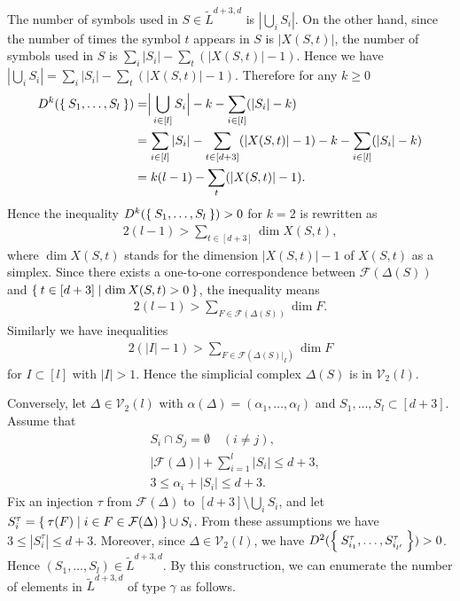 \documentclass{wstmp}
\begin{document}
The number of symbols used in $S\in \tilde L^{d+3,d}$
is ${\left|{\bigcup_i S_i}\right|}$.
On the other hand,
since 
the number of times the symbol $t$ appears in $S$ is ${\left|{X(S,t)}\right|}$,
the number of symbols used in $S$ is
$\sum_i {\left|{S_i}\right|} - \sum_t({\left|{X(S,t)}\right|}-1)$.
Hence we have 
${\left|{\bigcup_i S_i}\right|}=\sum_i {\left|{S_i}\right|} - \sum_t({\left|{X(S,t)}\right|}-1)$.
Therefore for any $k\ge 0$
\begin{align*}
D^{k}(\Set{S_1,\ldots,S_l})
&=\Bigr|\bigcup_{i \in [l]} S_i \Bigr| -k - \sum_{i\in [l]} ({\left|{S_i}\right|}-k)\\
&=\sum_{i\in [l]} {\left|{S_i}\right|} - \sum_{t\in [d+3]}({\left|{X(S,t)}\right|}-1)
-k - \sum_{i\in [l]} ({\left|{S_i}\right|}-k)\\
&=k(l-1) - \sum_t({\left|{X(S,t)}\right|}-1).
\end{align*}
Hence 
the inequality 
$D^{k}(\Set{S_1,\ldots,S_l})>0$ for $k=2$ 
is rewritten as
\begin{align*}
2(l-1)>\sum_{t \in [d+3]}\dim X(S,t),
\end{align*}
where  $\dim X(S,t)$ 
stands for the dimension ${\left|{X(S,t)}\right|}-1$ of $X(S,t)$ as a simplex.
Since there exists a one-to-one correspondence 
between ${\mathcal{F}}(\Delta(S))$
and $\Set{t \in [d+3] | \dim X(S,t)>0}$,
the inequality means
\begin{align*}
2(l-1)>\sum_{F\in {\mathcal{F}}(\Delta(S))} \dim F.
\end{align*}
Similarly we have inequalities 
\begin{align*}
2({\left|{I}\right|}-1)>\sum_{F\in {\mathcal{F}}(\Delta(S)|_{I})} \dim F
\end{align*}
for $I \subset [l]$ with ${\left|{I}\right|}>1$.
Hence 
the simplicial complex $\Delta(S)$ is in ${\mathcal{V}}_2(l)$.

Conversely, let $\Delta \in {\mathcal{V}}_2(l)$ with $\alpha(\Delta)=(\alpha_1,\ldots,\alpha_l)$ and $S_1,\ldots,S_l \subset [d+3]$.
Assume that
\begin{align*}
&S_i \cap S_j = \emptyset  \quad  (i\neq j) , \\
&{\left|{{\mathcal{F}}(\Delta)}\right|}+\sum_{i=1}^{l} {\left|{S_i}\right|} \leq d+3 ,\\
&3\leq  \alpha_i+{\left|{S_i}\right|} \leq d+3.
\end{align*}
Fix an injection $\tau$  from ${\mathcal{F}}(\Delta)$ to $[d+3]\setminus \bigcup_i S_i$,
and let $S^{\tau}_i = \Set{\tau(F) | i\in F\in {\mathcal{F}}(\Delta)} \cup S_i$.
From these assumptions we have 
$3\leq  {\left|{S^{\tau}_i}\right|} \leq d+3$.
Moreover, since $\Delta \in {\mathcal{V}}_2(l)$,
we have 
$D^{2}(\Set{S^{\tau}_{i_1},\ldots,S^{\tau}_{i_{l'}}})>0$.
Hence $(S_1,\ldots,S_l) \in  \tilde L^{d+3,d}$.
By this construction, we can enumerate the number of elements in 
$\tilde L^{d+3,d}$ of type $\gamma$ as follows.
\end{document}
